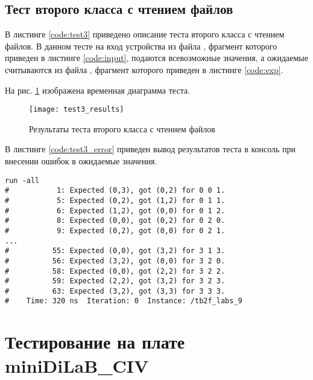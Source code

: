 \subsection{Тест второго класса с чтением файлов}

В листинге \ref{code:test3} приведено описание теста второго класса с чтением файлов. В данном тесте на вход устройства из файла , фрагмент которого приведен в листинге \ref{code:input}, подаются всевозможные значения, а ожидаемые считываются из файла , фрагмент которого приведен в листинге \ref{code:exp}.

\begin{multicols}{2}
		
	
\end{multicols}

На рис. \ref{fig:test3_results} изображена временная диаграмма теста.
\begin{figure}[H]
	\begin{center}
		\texttt{[image: test3\_results]}
		\caption{Результаты теста второго класса с чтением файлов}
		\label{fig:test3_results}
	\end{center}
\end{figure}

В листинге \ref{code:test3_error} приведен вывод результатов теста в консоль при внесении ошибок в ожидаемые значения.
\begin{lstlisting}[caption=Результаты ошибочного теста второго класса с чтением файлов, label=code:test3_error, style=console]
run -all
#           1: Expected (0,3), got (0,2) for 0 0 1.
#           5: Expected (0,2), got (1,2) for 0 1 1.
#           6: Expected (1,2), got (0,0) for 0 1 2.
#           8: Expected (0,0), got (0,2) for 0 2 0.
#           9: Expected (0,2), got (0,0) for 0 2 1.
...
#          55: Expected (0,0), got (3,2) for 3 1 3.
#          56: Expected (3,2), got (0,0) for 3 2 0.
#          58: Expected (0,0), got (2,2) for 3 2 2.
#          59: Expected (2,2), got (3,2) for 3 2 3.
#          63: Expected (3,2), got (3,3) for 3 3 3.
#    Time: 320 ns  Iteration: 0  Instance: /tb2f_labs_9
\end{lstlisting}

\newpage

\section{Тестирование на плате miniDiLaB\_CIV}

